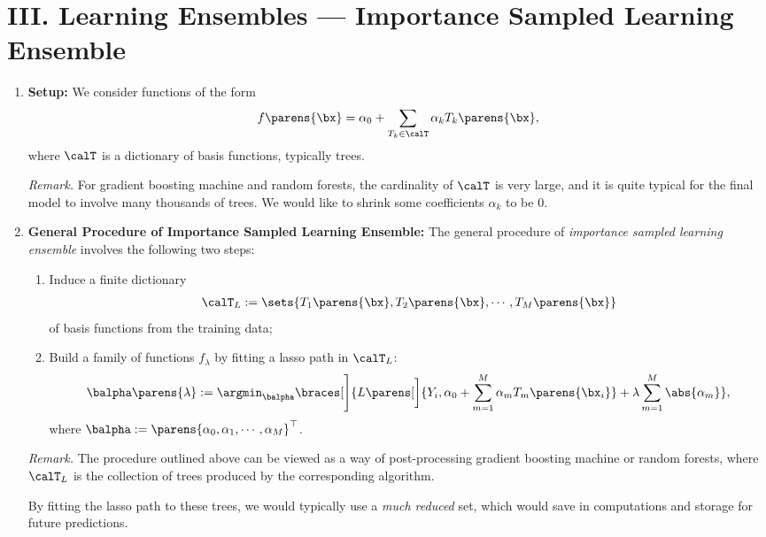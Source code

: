 \documentclass[12pt]{article}
\begin{document}
\section*{III. Learning Ensembles --- Importance Sampled Learning Ensemble}

\begin{enumerate}[label=\textbf{\arabic*.}]
	
	\item \textbf{Setup:} We consider functions of the form 
	\begin{align*}
		f \parens{\bx} = \alpha_0 + \sum_{T_k \in \calT} \alpha_k T_k \parens{\bx}, 
	\end{align*}
	where $\calT$ is a dictionary of basis functions, typically trees. 
	
	\textit{Remark.} For gradient boosting machine and random forests, the cardinality of $\calT$ is very large, and it is quite typical for the final model to involve many thousands of trees. We would like to shrink some coefficients $\alpha_k$ to be 0. 
	
	\item \textbf{General Procedure of Importance Sampled Learning Ensemble:} The general procedure of \emph{importance sampled learning ensemble} involves the following two steps: 
	\begin{enumerate}
		\item Induce a finite dictionary 
		\begin{align*}
			\calT_L := \sets{T_1 \parens{\bx}, T_2 \parens{\bx}, \cdots, T_M \parens{\bx}}
		\end{align*}
		of basis functions from the training data; 
		\item Build a family of functions $f_{\lambda}$ by fitting a lasso path in $\calT_L$: 
		\begin{align*}
			\balpha \parens{\lambda} := \argmin_{\balpha} \braces[\Bigg]{L \parens[\bigg]{Y_i, \alpha_0 + \sum_{m=1}^M \alpha_m T_m \parens{\bx_i}} + \lambda \sum_{m=1}^M \abs{\alpha_m}}, 
		\end{align*}
		where $\balpha := \parens{\alpha_0, \alpha_1, \cdots, \alpha_M}^\top$. 
	\end{enumerate}
	
	\textit{Remark.} The procedure outlined above can be viewed as a way of post-processing gradient boosting machine or random forests, where $\calT_L$ is the collection of trees produced by the corresponding algorithm. 
	
	By fitting the lasso path to these trees, we would typically use a \emph{much reduced} set, which would save in computations and storage for future predictions. 
	

\end{enumerate}
\end{document}
